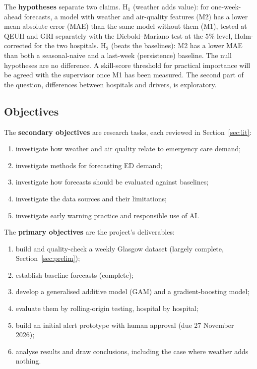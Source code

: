 \documentclass[12pt]{article}
\begin{document}
The \textbf{hypotheses} separate two claims. H$_1$ (weather adds value): for one-week-ahead forecasts, a model with weather and air-quality features (M2) has a lower mean absolute error (MAE) than the same model without them (M1), tested at QEUH and GRI separately with the Diebold--Mariano test at the 5\% level, Holm-corrected for the two hospitals. H$_2$ (beats the baselines): M2 has a lower MAE than both a seasonal-naive and a last-week (persistence) baseline. The null hypotheses are no difference. A skill-score threshold for practical importance will be agreed with the supervisor once M1 has been measured. The second part of the question, differences between hospitals and drivers, is exploratory.

\subsection{Objectives}
The \textbf{secondary objectives} are research tasks, each reviewed in Section~\ref{sec:lit}:
\begin{enumerate}
\item investigate how weather and air quality relate to emergency care demand;
\item investigate methods for forecasting ED demand;
\item investigate how forecasts should be evaluated against baselines;
\item investigate the data sources and their limitations;
\item investigate early warning practice and responsible use of AI.
\end{enumerate}
The \textbf{primary objectives} are the project's deliverables:
\begin{enumerate}
\item build and quality-check a weekly Glasgow dataset (largely complete, Section~\ref{sec:prelim});
\item establish baseline forecasts (complete);
\item develop a generalised additive model (GAM) and a gradient-boosting model;
\item evaluate them by rolling-origin testing, hospital by hospital;
\item build an initial alert prototype with human approval (due 27 November 2026);
\item analyse results and draw conclusions, including the case where weather adds nothing.
\end{enumerate}
\end{document}
